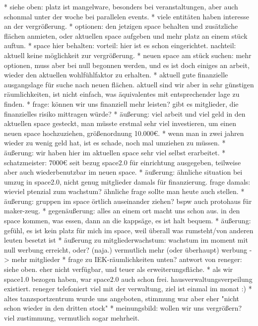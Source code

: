 \documentclass{s0minutes}
\begin{document}
		* siehe oben: platz ist mangelware, besonders bei veranstaltungen, aber auch schonmal unter der woche bei parallelen events.
		* viele entitäten haben interesse an der vergrößerung.
		* optionen: den jetzigen space behalten und zusätzliche flächen anmieten, oder aktuellen space aufgeben und mehr platz an einem stück auftun.
			* space hier behalten: vorteil: hier ist es schon eingerichtet. nachteil: aktuell keine möglichkeit zur vergrößerung.
			* neuen space am stück suchen: mehr optionen, muss aber bei null begonnen werden, und es ist doch einiges an arbeit, wieder den aktuellen wohlfühlfaktor zu erhalten.
		* aktuell gute finanzielle ausgangslage für suche nach neuen flächen. aktuell sind wir aber in sehr günstigen räumlichkeiten, ist nicht einfach, was äquivalentes mit entsprechender lage zu finden.
		* frage: können wir uns finanziell mehr leisten? gibt es mitglieder, die finanzielles risiko mittragen würde?
			* äußerung: viel arbeit und viel geld in den aktuellen space gesteckt, man müsste erstmal sehr viel investieren, um einen neuen space hochzuziehen, größenordnung 10.000€.
				* wenn man in zwei jahren wieder zu wenig geld hat, ist es schade, noch mal umziehen zu müssen.
			* äußerung: wir haben hier im aktuellen space sehr viel selbst erarbeitet.
			* schatzmeister: 7000€ seit bezug space2.0 für einrichtung ausgegeben, teilweise aber auch wiederbenutzbar im neuen space.
			* äußerung: ähnliche situation bei umzug in space2.0, nicht genug mitglieder damals für finanzierung. frage damals: wieviel ptenzial zum wachstum? ähnliche frage sollte man heute auch stellen.
			* äußerung: gruppen im space örtlich auseinander ziehen? bspw auch protohaus für maker-zeug. 
			* gegenäußerung: alles an einem ort macht uns schon aus. in den space kommen, was essen, dann an die kappsäge, es ist halt bequem.
			* äußerung: gefühl, es ist kein platz für mich im space, weil überall was rumsteht/von anderen leuten besetzt ist
			* äußerung zu mitgliederwachstum: wachstum im moment mit null werbung erreicht, oder? (naja.) vermutlich mehr (oder überhaupt) werbung -> mehr mitglieder
			* frage zu IEK-räumlichkeiten unten? antwort von reneger: siehe oben. eher nicht verfügbar, und teuer als erweiterungsfläche.
			* als wir space1.0 bezogen haben, war space2.0 auch schon frei. hausverwaltungsverpeilung existiert. reneger telefoniert viel mit der verwaltung, ziel ist einmal im monat :)
				* altes tanzsportzentrum wurde uns angeboten, stimmung war aber eher "nicht schon wieder in den dritten stock"
		* meinungsbild: wollen wir uns vergrößern? viel zustimmung, vermutlich sogar mehrheit.
\end{document}
